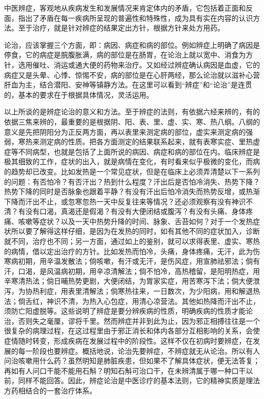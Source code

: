 \documentclass[a4paper,12pt,UTF8,twoside]{ctexbook}
\begin{document}
中医辨症，客观地从疾病发生和发展情况来肯定体内的矛盾，它包括着正面和反面，指出了矛盾在每一疾病所呈现的普遍性和特殊性，成为具有实在内容的认识方法。至于治疗，就是针对辨症的结果定出方针，根据方针来处方用药。

论治，应该掌握三个方面，即：病因、病症和病的部位。例如辨症上明确了病因是停食，它的病症是脘腹胀满，病的部位是在肠胃，在论治上就以宽中、消食为方针，选用催吐、消运或通大便的药物来治疗。又如经过辨症确认病因是血虚，它的病症又是头晕、心悸、惊惕不安，病的部位是在心肝两经，那么论治就以滋补心营肝血为主，结合潜阳、安神等镇静方法。在这里可以看到“辨症”和“论治”是连贯的，基本的要求在于根据具体情况，灵活运用。

以上所谈的是辨症论治的意义和方法。至于辨症的法则，有依据六经来辨的，有的依据三焦来辨的，最重要的是根据阴、阳、表、里、虚、实、寒、热八纲。八纲的意义是先把阴阳分为正反两方面，再以表里来测定病的部位，虚实来测定病的强弱，寒热来测定病的性质。把各方面测定的结果联系起来，就有表寒实症、里热虚症等不同病型，也就是包括了上面所说的病因、病症和病的部位在内。临床辨症是极其细致的工作，症状的出入，就是病情在变化，有时看来似乎极微的变化，而病的趋势却已改变。比如发热是一个常见症状，但是在临床上必须弄清楚以下一系列的问题：有否怕冷？有否汗出？热到什么程度？汗出后是否怕冷消失、热势下降？热势下降的同时是否脉象也跟着平静？有没有汗出后怕冷消失而热势反增，或热渐下降而汗出不止，或忽寒忽热一天中反复往来等情况？还必须观察有没有神识不清？有没有口渴，真渴还是假渴？有没有大便闭结或腹泻？有没有头痛、身体疼痛、咳嗽等症状？以及一天中热势升降的时间、脉象、舌苔如何？对于一个发热症状所以要了解得这样仔细，是因为在发热的同时，如有其他不同的症状加入，诊断就不同，治疗也不同；另一方面，通过如上的鉴别，就可以求得表里、虚实、寒热的病情，借以定出治疗的方针。比如发热而怕冷，头痛，身体疼痛，无汗，此为伤寒病初期，用辛温发散法；倘咳嗽，有汗或无汗，是伤风症，用宣肺祛邪法；倘有汗，口渴，是风温病初期，用辛凉清解法；倘不怕冷，高热稽留，是阳明热症，用辛寒清热法；倘日晡热势更剧，大便闭结，为胃家实症，用苦寒泻下法；倘大便泄泻，为协热利症，用表里清解法；倘寒热往来，一日数次，为少阳病，用和解退热法；倘舌红，神识不清，为热入心包症，用清心凉营法。其他如热降而汗出不止，须防亡阳虚脱等。这些说明了辨症是要分辨疾病的性质，明确疾病的性质才能论治，否则失之毫厘，谬将千里。然而辨症并非到此为止，因为邪正相搏往往是一个很复杂的病理过程，在这过程里由于邪正消长和体内各部分互相影响的关系，会使症情随时转变，形成疾病在发展过程中的阶段性。这样不仅在初病时要辨症，在发展的每一阶段也要辨症。概括地说，论治先要辨症，不辨症就无从论治。所以有人问治咳嗽用什么药？虽然明知是肺脏疾患，但如果不了解具体症状，便无法答复；再如有人问口干能不能用石斛？明知石斛可治口干，在未辨清属于哪一种口干以前，同样不能回答。因此，辨症论治是中医诊疗的基本法则，它的精神实质是理法方药相结合的一套治疗体系。
\end{document}
